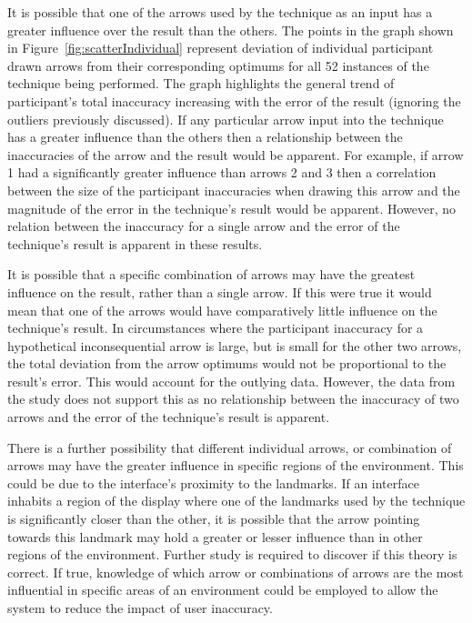 \documentclass{bmcart}
\begin{document}
It is possible that one of the arrows used by the technique as an input has a greater influence over the result than the others.
The points in the graph shown in Figure~\ref{fig:scatterIndividual} represent deviation of individual participant drawn arrows from their corresponding optimums for all 52 instances of the technique being performed.
The graph highlights the general trend of participant's total inaccuracy increasing with the error of the result (ignoring the outliers previously discussed).
If any particular arrow input into the technique has a greater influence than the others then a relationship between the inaccuracies of the arrow and the result would be apparent.
For example, if arrow 1 had a significantly greater influence than arrows 2 and 3 then a correlation between the size of the participant inaccuracies when drawing this arrow and the magnitude of the error in the technique's result would be apparent.
However, no relation between the inaccuracy for a single arrow and the error of the technique's result is apparent in these results.

It is possible that a specific combination of arrows may have the greatest influence on the result, rather than a single arrow.
If this were true it would mean that one of the arrows would have comparatively little influence on the technique's result.
In circumstances where the participant inaccuracy for a hypothetical inconsequential arrow is large, but is small for the other two arrows, the total deviation from the arrow optimums would not be proportional to the result's error.
This would account for the outlying data.
However, the data from the study does not support this as no relationship between the inaccuracy of two arrows and the error of the technique's result is apparent.

There is a further possibility that different individual arrows, or combination of arrows may have the greater influence in specific regions of the environment.
This could be due to the interface's proximity to the landmarks.
If an interface inhabits a region of the display where one of the landmarks used by the technique is significantly closer than the other, it is possible that the arrow pointing towards this landmark may hold a greater or lesser influence than in other regions of the environment.
Further study is required to discover if this theory is correct.
If true, knowledge of which arrow or combinations of arrows are the most influential in specific areas of an environment could be employed to allow the system to reduce the impact of user inaccuracy.
\end{document}
